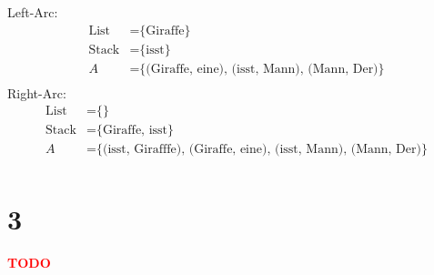 \documentclass[a4paper,11pt,fleqn]{scrartcl}
\newcommand{\todo}{\textcolor{red}{\textbf{TODO}}}
\begin{document}
Left-Arc:
\begin{align}
	\text{List} &= \text{\{Giraffe\}} \\ 
	\text{Stack} &= \text{\{isst\}} \\
	A &= \text{\{(Giraffe, eine), (isst, Mann), (Mann, Der)\}} \\	
\end{align}
Right-Arc:
\begin{align}
	\text{List} &= \text{\{\}} \\ 
	\text{Stack} &= \text{\{Giraffe, isst\}} \\
	A &= \text{\{(isst, Girafffe), (Giraffe, eine), (isst, Mann), (Mann, Der)\}} \\	
\end{align}


\section*{3}
\todo
\end{document}
